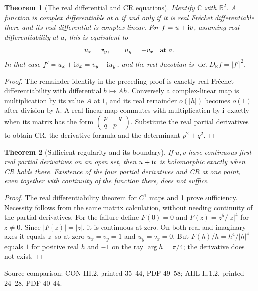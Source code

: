 \documentclass[11pt,a4paper,openany]{book}
\newtheorem{theorem}{Theorem}[chapter]
\theoremstyle{definition}
\theoremstyle{remark}\newtheorem{remark}[theorem]{Remark}
\newcommand{\R}{\mathbb R}\newcommand{\C}{\mathbb C}
\newcommand{\family}[1]{}
\newcommand{\source}[1]{\par\begingroup\small\sffamily\color{black!65}Source comparison: #1\par\endgroup}
\begin{document}
\begin{theorem}[The real differential and CR equations]\family{D12.01.02}\label{d12:01-02}
Identify \(\C\) with \(\R^2\). A function is complex differentiable at \(a\)
if and only if it is real Fr\'echet differentiable there and its real
differential is complex-linear. For \(f=u+\mathrm i v\), assuming real
differentiability at \(a\), this is equivalent to
\[
 u_x=v_y,\qquad u_y=-v_x \quad\hbox{at }a.
\]
In that case \(f'=u_x+\mathrm i v_x=v_y-\mathrm i u_y\), and the real Jacobian is
\(\det D_{\R}f=|f'|^2\).
\end{theorem}
\begin{proof}
The remainder identity in the preceding proof is exactly real Fr\'echet
differentiability with differential \(h\mapsto Ah\).
Conversely a complex-linear map is multiplication by its value \(A\) at
\(1\), and its real remainder \(o(|h|)\) becomes \(o(1)\) after division
by \(h\). A real-linear map commutes with multiplication by \(\mathrm i\)
exactly when its matrix has the form
\(\left(\begin{smallmatrix}p&-q\\q&p\end{smallmatrix}\right)\).
Substitute the real partial derivatives to obtain CR, the derivative
formula and the determinant \(p^2+q^2\).
\end{proof}

\begin{theorem}[Sufficient regularity and its boundary]\family{D12.01.03}\label{d12:01-03}
If \(u,v\) have continuous first real partial derivatives on an open set,
then \(u+\mathrm i v\) is holomorphic exactly when CR holds there.
Existence of the four partial derivatives and CR at one point, even together
with continuity of the function there, does not suffice.
\end{theorem}
\begin{proof}
The real differentiability theorem for \(C^1\) maps and
\cref{d12:01-02} prove sufficiency. Necessity follows from the same matrix
calculation, without needing continuity of the partial derivatives.
For the failure define \(F(0)=0\) and
\(F(z)=z^5/|z|^4\) for \(z\ne0\). Since \(|F(z)|=|z|\), it is continuous
at zero. On both real and imaginary axes it equals \(z\), so at zero
\(u_x=v_y=1\) and \(u_y=v_x=0\). But
\(F(h)/h=h^4/|h|^4\) equals \(1\) for positive real \(h\) and \(-1\)
on the ray \(\arg h=\pi/4\); the derivative does not exist.
\end{proof}
\source{CON III.2, printed 35--44, PDF 49--58; AHL II.1.2, printed 24--28, PDF 40--44.}
\end{document}
